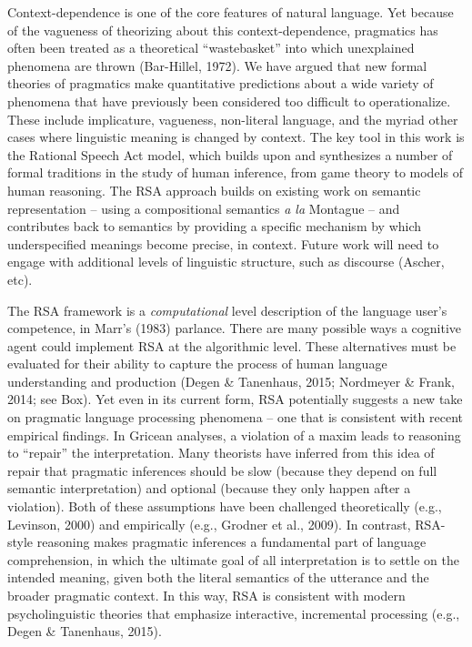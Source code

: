 \documentclass[]{elsarticle}
\begin{document}
Context-dependence is one of the core features of natural language. Yet
because of the vagueness of theorizing about this context-dependence,
pragmatics has often been treated as a theoretical ``wastebasket'' into
which unexplained phenomena are thrown (Bar-Hillel, 1972). We have
argued that new formal theories of pragmatics make quantitative
predictions about a wide variety of phenomena that have previously been
considered too difficult to operationalize. These include implicature,
vagueness, non-literal language, and the myriad other cases where
linguistic meaning is changed by context. The key tool in this work is
the Rational Speech Act model, which builds upon and synthesizes a
number of formal traditions in the study of human inference, from game
theory to models of human reasoning. The RSA approach builds on existing
work on semantic representation -- using a compositional semantics
\emph{a la} Montague -- and contributes back to semantics by providing a
specific mechanism by which underspecified meanings become precise, in
context. Future work will need to engage with additional levels of
linguistic structure, such as discourse (Ascher, etc).

The RSA framework is a \emph{computational} level description of the
language user's competence, in Marr's (1983) parlance. There are many
possible ways a cognitive agent could implement RSA at the algorithmic
level. These alternatives must be evaluated for their ability to capture
the process of human language understanding and production (Degen \&
Tanenhaus, 2015; Nordmeyer \& Frank, 2014; see Box). Yet even in its
current form, RSA potentially suggests a new take on pragmatic language
processing phenomena -- one that is consistent with recent empirical
findings. In Gricean analyses, a violation of a maxim leads to reasoning
to ``repair'' the interpretation. Many theorists have inferred from this
idea of repair that pragmatic inferences should be slow (because they
depend on full semantic interpretation) and optional (because they only
happen after a violation). Both of these assumptions have been
challenged theoretically (e.g., Levinson, 2000) and empirically (e.g.,
Grodner et al., 2009). In contrast, RSA-style reasoning makes pragmatic
inferences a fundamental part of language comprehension, in which the
ultimate goal of all interpretation is to settle on the intended
meaning, given both the literal semantics of the utterance and the
broader pragmatic context. In this way, RSA is consistent with modern
psycholinguistic theories that emphasize interactive, incremental
processing (e.g., Degen \& Tanenhaus, 2015).
\end{document}
